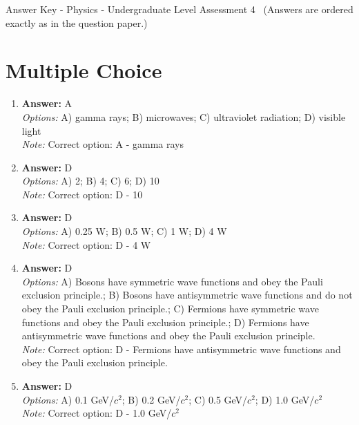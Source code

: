 \documentclass[12pt]{article}
\begin{document}
\begin{center}
Answer Key - Physics - Undergraduate Level Assessment 4 \
\small (Answers are ordered exactly as in the question paper.)
\end{center}

\section*{Multiple Choice}
\begin{enumerate}[label=\arabic*.]
\item \textbf{Answer:} A
\\ \textit{Options:} A) gamma rays; B) microwaves; C) ultraviolet radiation; D) visible light
\\ \textit{Note:} Correct option: A - gamma rays
\item \textbf{Answer:} D
\\ \textit{Options:} A) 2; B) 4; C) 6; D) 10
\\ \textit{Note:} Correct option: D - 10
\item \textbf{Answer:} D
\\ \textit{Options:} A) 0.25 W; B) 0.5 W; C) 1 W; D) 4 W
\\ \textit{Note:} Correct option: D - 4 W
\item \textbf{Answer:} D
\\ \textit{Options:} A) Bosons have symmetric wave functions and obey the Pauli exclusion principle.; B) Bosons have antisymmetric wave functions and do not obey the Pauli exclusion principle.; C) Fermions have symmetric wave functions and obey the Pauli exclusion principle.; D) Fermions have antisymmetric wave functions and obey the Pauli exclusion principle.
\\ \textit{Note:} Correct option: D - Fermions have antisymmetric wave functions and obey the Pauli exclusion principle.
\item \textbf{Answer:} D
\\ \textit{Options:} A) 0.1 GeV/$c^2$; B) 0.2 GeV/$c^2$; C) 0.5 GeV/$c^2$; D) 1.0 GeV/$c^2$
\\ \textit{Note:} Correct option: D - 1.0 GeV/$c^2$
\end{enumerate}
\end{document}
